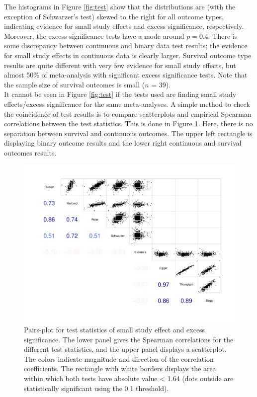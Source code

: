 The histograms in Figure \ref{fig:test} show that the distributions are (with the exception of Schwarzer's test) skewed to the right for all outcome types, indicating evidence for small study effects and excess significance, respectively. Moreover, the excess significance tests have a mode around $p = 0.4$. There is some discrepancy between continuous and binary data test results; the evidence for small study effects in continuous data is clearly larger. Survival outcome type results are quite different with very few evidence for small study effects, but almost 50\% of meta-analysis with significant excess significance tests. Note that the sample size of survival outcomes is small ($n$ = 39).\\
It cannot be seen in Figure \ref{fig:test} if the tests used are finding small study effects/excess significance for the same meta-analyses. A simple method to check the coincidence of test results is to compare scatterplots and empirical Spearman correlations between the test statistics. This is done in Figure \ref{fig:test.agreement}. Here, there is no separation between survival and continuous outcomes. The upper left rectangle is displaying binary outcome results and the lower right continuous and survival outcomes results.

\begin{figure}
\begin{knitrout}
\color{fgcolor}

{\centering \includegraphics[width=\textwidth-3cm]{figure/ch03_figunnamed-chunk-3-1} 

}



\end{knitrout}
\caption{Pairs-plot for test statistics of small study effect and excess significance. The lower panel gives the Spearman correlations for the different test statistics, and the upper panel displays a scatterplot. The colors indicate magnitude and direction of the correlation coefficients. The rectangle with white borders displays the area within which both tests have absolute value < 1.64 (dots outside are statistically significant using the 0.1 threshold).}
\label{fig:test.agreement}
\end{figure}

